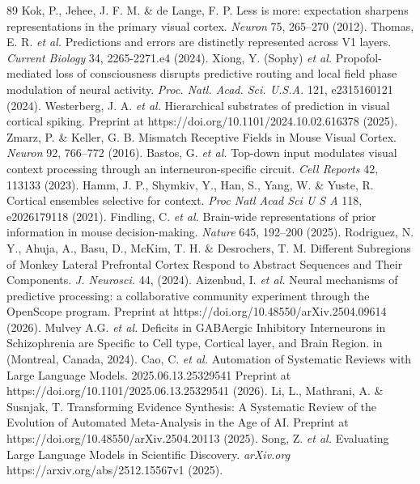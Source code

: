 \documentclass[12pt]{article}
\begin{document}
\begin{thebibliography}{89}
 Kok, P., Jehee, J. F. M. \& de Lange, F. P. Less is more: expectation sharpens representations in the primary visual cortex. \emph{Neuron} 75, 265--270 (2012).
 Thomas, E. R. \emph{et al.} Predictions and errors are distinctly represented across V1 layers. \emph{Current Biology} 34, 2265-2271.e4 (2024).
 Xiong, Y. (Sophy) \emph{et al.} Propofol-mediated loss of consciousness disrupts predictive routing and local field phase modulation of neural activity. \emph{Proc. Natl. Acad. Sci. U.S.A.} 121, e2315160121 (2024).
 Westerberg, J. A. \emph{et al.} Hierarchical substrates of prediction in visual cortical spiking. Preprint at https://doi.org/10.1101/2024.10.02.616378 (2025).
 Zmarz, P. \& Keller, G. B. Mismatch Receptive Fields in Mouse Visual Cortex. \emph{Neuron} 92, 766--772 (2016).
 Bastos, G. \emph{et al.} Top-down input modulates visual context processing through an interneuron-specific circuit. \emph{Cell Reports} 42, 113133 (2023).
 Hamm, J. P., Shymkiv, Y., Han, S., Yang, W. \& Yuste, R. Cortical ensembles selective for context. \emph{Proc Natl Acad Sci U S A} 118, e2026179118 (2021).
 Findling, C. \emph{et al.} Brain-wide representations of prior information in mouse decision-making. \emph{Nature} 645, 192--200 (2025).
 Rodriguez, N. Y., Ahuja, A., Basu, D., McKim, T. H. \& Desrochers, T. M. Different Subregions of Monkey Lateral Prefrontal Cortex Respond to Abstract Sequences and Their Components. \emph{J. Neurosci.} 44, (2024).
 Aizenbud, I. \emph{et al.} Neural mechanisms of predictive processing: a collaborative community experiment through the OpenScope program. Preprint at https://doi.org/10.48550/arXiv.2504.09614 (2026).
 Mulvey A.G. \emph{et al.} Deficits in GABAergic Inhibitory Interneurons in Schizophrenia are Specific to Cell type, Cortical layer, and Brain Region. in (Montreal, Canada, 2024).
 Cao, C. \emph{et al.} Automation of Systematic Reviews with Large Language Models. 2025.06.13.25329541 Preprint at https://doi.org/10.1101/2025.06.13.25329541 (2026).
 Li, L., Mathrani, A. \& Susnjak, T. Transforming Evidence Synthesis: A Systematic Review of the Evolution of Automated Meta-Analysis in the Age of AI. Preprint at https://doi.org/10.48550/arXiv.2504.20113 (2025).
 Song, Z. \emph{et al.} Evaluating Large Language Models in Scientific Discovery. \emph{arXiv.org} https://arxiv.org/abs/2512.15567v1 (2025).

\end{thebibliography}
\end{document}
